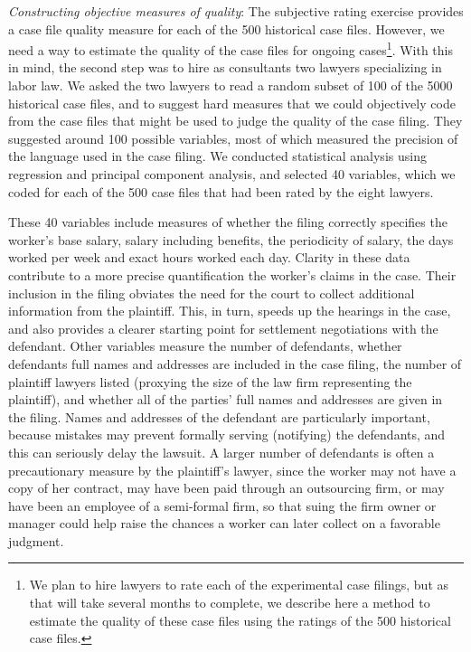 \documentclass[12 pt]{article}
\begin{document}
\emph{Constructing objective measures of quality}: The subjective rating exercise provides a case file quality measure for each of the 500 historical case files. However, we need a way to estimate the quality of the case files for ongoing cases\footnote{We plan to hire lawyers to rate each of the experimental case filings, but as that will take several months to complete, we describe here a method to estimate the quality of these case files using the ratings of the 500 historical case files.}.  With this in mind, the second step was to hire as consultants two lawyers specializing in labor law. We asked the two lawyers to read a random subset of 100 of the 5000 historical case files, and to suggest hard measures that we could objectively code from the case files that might be used to judge the quality of the case filing. They suggested around 100 possible variables, most of which measured the precision of the language used in the case filing. We conducted statistical analysis using regression and principal component analysis, and selected 40 variables, which we coded for each of the 500 case files that had been rated by the eight lawyers. 

These 40 variables include measures of whether the filing correctly specifies the worker’s base salary, salary including benefits, the periodicity of salary, the days worked per week and exact hours worked each day. Clarity in these data contribute to a more precise quantification the worker’s claims in the case. Their inclusion in the filing obviates the need for the court to collect additional information from the plaintiff. This, in turn, speeds up the hearings in the case, and also provides a clearer starting point for settlement negotiations with the defendant. Other variables measure the number of defendants, whether defendants full names and addresses are included in the case filing, the number of plaintiff lawyers listed (proxying the size of the law firm representing the plaintiff), and whether all of the parties’ full names and addresses are given in the filing. Names and addresses of the defendant are particularly important, because mistakes may prevent formally serving (notifying) the defendants, and this can seriously delay the lawsuit. A larger number of defendants is often a precautionary measure by the plaintiff’s lawyer, since the worker may not have a copy of her contract, may have been paid through an outsourcing firm, or may have been an employee of a semi-formal firm, so that suing the firm owner or manager could help raise the chances a worker can later collect on a favorable judgment. 
\end{document}
